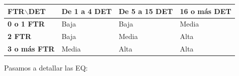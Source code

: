 \documentclass[spanish,a4paper,11pt, twoside]{report}	%
\begin{document}
\vspace{0.35cm}

			\begin{tabular}{|p{3cm}||p{3cm}|p{3.2cm}|p{3cm}|}
				\hline
				\textbf{FTR$\backslash$DET} & \textbf{De 1 a 4 DET} & \textbf{De 5 a 15 DET} & \textbf{16  o más DET} \\ \hline \hline
				\textbf{0 o 1 FTR} & Baja & Baja & Media \\ \hline 
				\textbf{2 FTR} & Baja & Media & Alta \\ \hline 
				\textbf{3 o más FTR} & Media & Alta & Alta \\ \hline 
			\end{tabular}

\vspace{0.35cm}

	Pasamos a detallar las EQ:
\end{document}
